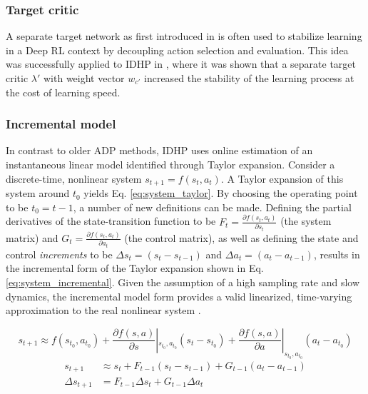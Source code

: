 \subsubsection{Target critic}
A separate target network as first introduced in \cite{Mnih2015, Lillicrap2015} is often used to stabilize learning in a Deep RL context by decoupling action selection and evaluation. This idea was successfully applied to IDHP in \cite{Heyer2020}, where it was shown that a separate target critic $\lambda'$ with weight vector $w_{c'}$ increased the stability of the learning process at the cost of learning speed. 

\subsubsection{Incremental model} \label{ssec:incrementalrls}
In contrast to older ADP methods, IDHP uses online estimation of an instantaneous linear model identified through Taylor expansion. Consider a discrete-time, nonlinear system $s_{t+1} = f(s_t, a_t)$. A Taylor expansion of this system around $t_0$ yields Eq. \eqref{eq:system_taylor}. By choosing the operating point to be $t_0 = t-1$, a number of new definitions can be made. 
Defining the partial derivatives of the state-transition function to be $F_t = \frac{\partial f(s_t, a_t) }{\partial s_t }$  (the system matrix) and $G_t = \frac{\partial f(s_t, a_t) }{\partial a_t}$ (the control matrix), as well as defining the state and control \textit{increments} to be $\Delta s_t = (s_t - s_{t-1})$ and $\Delta a_t = (a_t - a_{t-1})$, results in the incremental form of the Taylor expansion shown in Eq. \eqref{eq:system_incremental}. Given the assumption of a high sampling rate and slow dynamics, the incremental model form provides a valid linearized, time-varying approximation to the real nonlinear system \cite{Zhou2016iADP}.

\begin{equation}
\label{eq:system_taylor}
    s_{t+1} \approx f(s_{t_0}, a_{t_0}) + \frac{\partial f(s, a) }{\partial s } |_{s_{t_0}, a_{t_0}} (s_t - s_{t_0}) + \frac{\partial f(s, a) }{\partial a } |_{s_{t_0}, a_{t_0}} (a_t - a_{t_0})
\end{equation}
\begin{equation} \label{eq:system_incremental}
    \begin{split}
        s_{t+1} &\approx s_t + F_{t-1} (s_t - s_{t-1}) + G_{t-1} (a_t - a_{t-1}) \\
        \Delta s_{t+1} &= F_{t-1} \Delta s_t + G_{t-1} \Delta a_t
    \end{split}
\end{equation}

